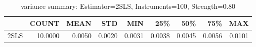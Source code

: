 \begin{table}[ht]
\centering
\caption{variance summary: Estimator=2SLS, Instruments=100, Strength=0.80}
\begin{tabular}{lrrrrrrrr}
\toprule
 & COUNT & MEAN & STD & MIN & 25\% & 50\% & 75\% & MAX \\
\midrule
2SLS & 10.0000 & 0.0050 & 0.0020 & 0.0031 & 0.0038 & 0.0045 & 0.0056 & 0.0101 \\
\bottomrule
\end{tabular}
\end{table}
